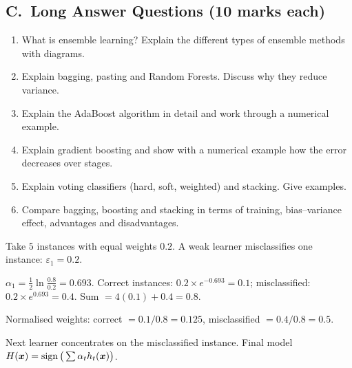 \subsection*{C.\ Long Answer Questions (10 marks each)}
\begin{enumerate}
  \item What is ensemble learning? Explain the different types of ensemble methods with diagrams. 
  \item Explain bagging, pasting and Random Forests. Discuss why they reduce variance. 
  \item Explain the AdaBoost algorithm in detail and work through a numerical example. 
  \item Explain gradient boosting and show with a numerical example how the error decreases over stages. 
  \item Explain voting classifiers (hard, soft, weighted) and stacking. Give examples. 
  \item Compare bagging, boosting and stacking in terms of training, bias--variance effect, advantages and disadvantages. 
\end{enumerate}

\begin{modelans}
Take $5$ instances with equal weights $0.2$. A weak learner misclassifies one instance: $\varepsilon_1=0.2$.\par
$\alpha_1=\frac12\ln\frac{0.8}{0.2}=0.693$. Correct instances: $0.2\times e^{-0.693}=0.1$; misclassified: $0.2\times e^{0.693}=0.4$. Sum $=4(0.1)+0.4=0.8$.\par
Normalised weights: correct $=0.1/0.8=0.125$, misclassified $=0.4/0.8=0.5$.\par
Next learner concentrates on the misclassified instance. Final model $H(\boldsymbol{x})=\operatorname{sign}\big(\sum\alpha_th_t(\boldsymbol{x})\big)$.
\end{modelans}

